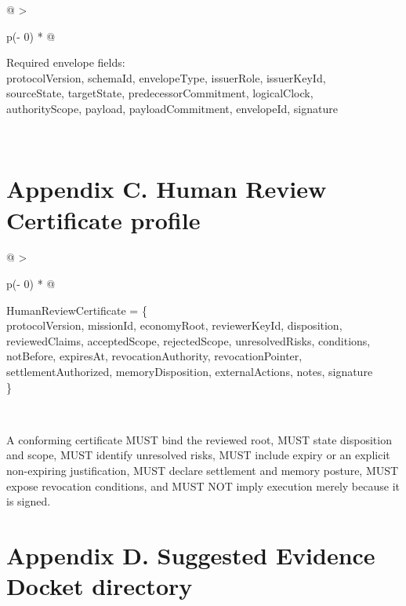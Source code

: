 \begin{longtable}[]{@{}
  >{\raggedright\arraybackslash}p{(\columnwidth - 0\tabcolsep) * }@{}}
\toprule\noalign{}
\begin{minipage}[b]{\linewidth}\raggedright
Required envelope fields:\\
protocolVersion, schemaId, envelopeType, issuerRole, issuerKeyId,\\
sourceState, targetState, predecessorCommitment, logicalClock,\\
authorityScope, payload, payloadCommitment, envelopeId, signature\strut
\end{minipage} \\
\midrule\noalign{}
\endhead
\bottomrule\noalign{}
\endlastfoot
\end{longtable}

\section{Appendix C. Human Review Certificate
profile}\label{appendix-c.-human-review-certificate-profile}

\begin{longtable}[]{@{}
  >{\raggedright\arraybackslash}p{(\columnwidth - 0\tabcolsep) * }@{}}
\toprule\noalign{}
\begin{minipage}[b]{\linewidth}\raggedright
HumanReviewCertificate = \{\\
protocolVersion, missionId, economyRoot, reviewerKeyId, disposition,\\
reviewedClaims, acceptedScope, rejectedScope, unresolvedRisks,
conditions,\\
notBefore, expiresAt, revocationAuthority, revocationPointer,\\
settlementAuthorized, memoryDisposition, externalActions, notes,
signature\\
\}\strut
\end{minipage} \\
\midrule\noalign{}
\endhead
\bottomrule\noalign{}
\endlastfoot
\end{longtable}

A conforming certificate MUST bind the reviewed root, MUST state
disposition and scope, MUST identify unresolved risks, MUST include
expiry or an explicit non-expiring justification, MUST declare
settlement and memory posture, MUST expose revocation conditions, and
MUST NOT imply execution merely because it is signed.

\section{Appendix D. Suggested Evidence Docket
directory}\label{appendix-d.-suggested-evidence-docket-directory}

